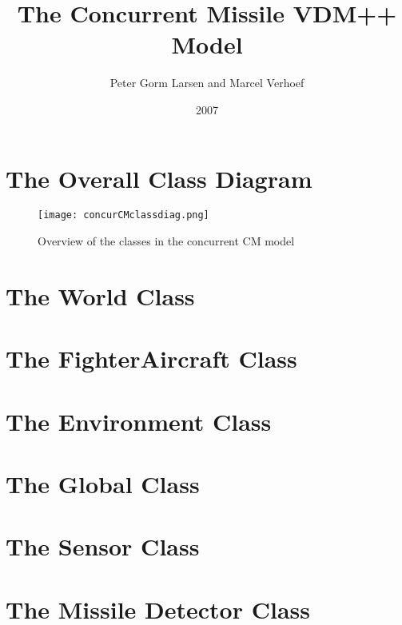 \documentclass[\pformat,12pt]{article}
\title{The Concurrent Missile VDM++ Model}
\author{Peter Gorm Larsen and Marcel Verhoef}
\date{2007}
\begin{document}
\maketitle

\section{The Overall Class Diagram}

\begin{figure}[h]
\begin{center}
\texttt{[image: concurCMclassdiag.png]}
\end{center}
\caption{Overview of the classes in the concurrent CM model}\label{fig:inputoutput}
\end{figure}
\newpage

\section{The World Class}



\section{The FighterAircraft Class}



\section{The Environment Class}



\section{The Global Class}



\section{The Sensor Class}



\section{The Missile Detector Class}


\end{document}
